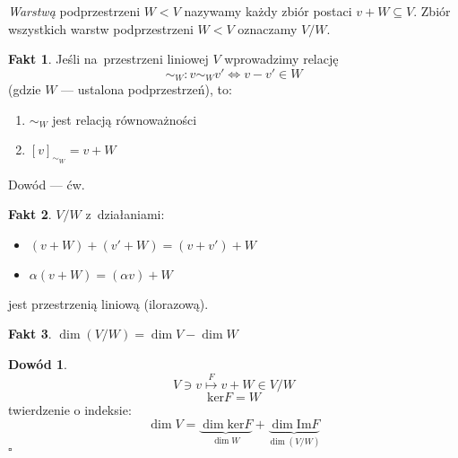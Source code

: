 \documentclass[12pt,a4paper]{article}
\renewcommand{\qed}{$\square$}
\theoremstyle{plain}
\theoremstyle{definition}
\newtheorem{ft}{Fakt}[section]
\theoremstyle{definition}
\theoremstyle{definition}
\theoremstyle{definition}
\newtheorem*{dd}{Dowód}
\theoremstyle{definition}
\theoremstyle{definition}
\theoremstyle{definition}
\theoremstyle{definition}
\theoremstyle{definition}
\begin{document}
\begin{def}
  \textit{Warstwą} podprzestrzeni $W < V$ nazywamy każdy zbiór postaci
  $v + W \subseteq V$. Zbiór wszystkich warstw podprzestrzeni $W < V$
  oznaczamy $V/W$.
\end{def}  
\begin{ft}
  Jeśli na~przestrzeni liniowej $V$ wprowadzimy relację
  \[\sim_W: v\sim_Wv' \Leftrightarrow v-v'\in W\]
  (gdzie $W$ --- ustalona podprzestrzeń), to:
  \begin{enumerate}
    \item $\sim_W$ jest relacją równoważności
    \item $[v]_{\sim_W} = v+W$
  \end{enumerate}
  Dowód --- ćw.
\end{ft}
\begin{ft}
  $V/W$ z~działaniami:
  \begin{itemize}
    \item $(v+W)+(v'+W) = (v+v')+W$
    \item $\alpha(v+W) = (\alpha v) + W$
  \end{itemize}
  jest przestrzenią liniową (ilorazową).
\end{ft}
\begin{ft}
  $\dim(V/W) = \dim V - \dim W$
\end{ft}
\begin{dd}
  \[V \ni v \overset F\longmapsto v+W \in V/W\]
  \[\mathrm{ker}F = W\]
  twierdzenie o indeksie:
  \[\dim V = \underbrace{\dim\mathrm{ker}F}_{\dim W} + \underbrace{\dim\mathrm{Im}F}_{\dim(V/W)}\]
  \hfill \qed
\end{dd}
\end{document}
